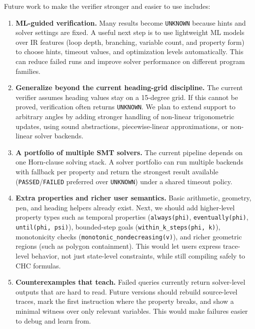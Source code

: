 Future work to make the verifier stronger and easier to use includes:
\begin{enumerate}
    \item \textbf{ML-guided verification.} Many results become \texttt{UNKNOWN} because hints and solver settings are fixed. A useful next step is to use lightweight ML models over IR features (loop depth, branching, variable count, and property form) to choose hints, timeout values, and optimization levels automatically. This can reduce failed runs and improve solver performance on different program families.

    \item \textbf{Generalize beyond the current heading-grid discipline.} The current verifier assumes heading values stay on a 15-degree grid. If this cannot be proved, verification often returns \texttt{UNKNOWN}. We plan to extend support to arbitrary angles by adding stronger handling of non-linear trigonometric updates, using sound abstractions, piecewise-linear approximations, or non-linear solver backends.
    
    \item \textbf{A portfolio of multiple SMT solvers.} The current pipeline depends on one Horn-clause solving stack. A solver portfolio can run multiple backends with fallback per property and return the strongest result available (\texttt{PASSED}/\texttt{FAILED} preferred over \texttt{UNKNOWN}) under a shared timeout policy.

    \item \textbf{Extra properties and richer user semantics.} Basic arithmetic, geometry, pen, and heading helpers already exist. Next, we should add higher-level property types such as temporal properties (\texttt{always(phi)}, \texttt{eventually(phi)}, \texttt{until(phi, psi)}), bounded-step goals (\texttt{within\_k\_steps(phi, k)}), monotonicity checks (\texttt{monotonic\_nondecreasing(v)}), and richer geometric regions (such as polygon containment). This would let users express trace-level behavior, not just state-level constraints, while still compiling safely to CHC formulas.
    
    \item \textbf{Counterexamples that teach.} Failed queries currently return solver-level outputs that are hard to read. Future versions should rebuild source-level traces, mark the first instruction where the property breaks, and show a minimal witness over only relevant variables. This would make failures easier to debug and learn from.
    

\end{enumerate}
